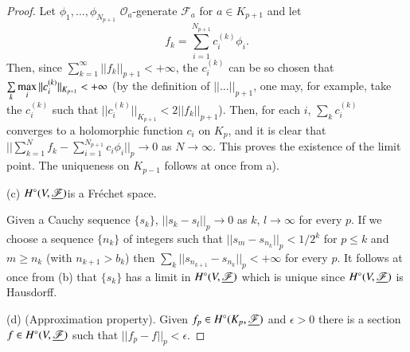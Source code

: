 \begin{proof}
Let $\phi_1, \ldots, \phi_{N_{p+1}}$ $\mathscr{O}_a$-generate
$\mathscr{F}_a$ for $a \in K_{p+1}$ and let 
$$
f_k = \sum\limits^{N_{p+1}}_{i=1} c^{(k)}_i \phi_i. 
$$
Then, since $\sum\limits^\infty_{k=1} ||f_k||_{p+1} < + \infty$, the
$c^{(k)}_i$ can be so chosen that $\sum\limits_k\max\limits_i\break
||c_i^{(k)} ||_{K_{p+1}} < + \infty$ (by the definition of $|| \ldots
||_{p+1}$, one may, for example, take the $c^{(k)}_i$ such that
$||c^{(k)}_i||_{K_{p+1}} < 2 ||f_k||_{p+1}$). Then, for each $i$,
$\sum_k c^{(k)}_i$  converges to a holomorphic function $c_i$ on
$K_p$, and it is clear that $|| \sum\limits^{N}_{k=1} f_k -
\sum\limits^{N_{p+1}}_{i=1} c_i \phi_i||_p \to 0$ as $N \to
\infty$. This proves the existence of the limit point. The uniqueness
on $K_{p-1}$ follows at once from a). 

(c) $H^\circ (V, \underline{\mathscr{F}})$\pageoriginale is a Fr\'echet space.

Given a Cauchy sequence $\{s_k\}$, $||s_k - s_l||_p \to 0$ as $k$, $l
\to \infty$ for every $p$. If we choose a sequence $\{n_k\}$ of
integers such that $||s_m - s_{n_k}||_p < 1/2^k$ for $p \leq k$ and $m
\geq n_k$ (with $n_{k+1} > b_k$) then $\sum\limits_k ||s_{n_{k+1}} -
s_{n_k}||_p < + \infty$ for every $p$. It follows at once from (b)
that $\{s_k\}$ has a limit in $H^\circ (V, \underline{\mathscr{F}})$ which is
unique since $H^\circ (V, \underline{\mathscr{F}})$ is Hausdorff. 

(d) (Approximation property). Given $f_p \in H^\circ (K_p,
\underline{\mathscr{F}})$ and $ \epsilon >0$ there is a section $f \in H^\circ (V,
\underline{\mathscr{F}})$ such that $||f_p - f||_p < \epsilon$. 
\end{proof}

